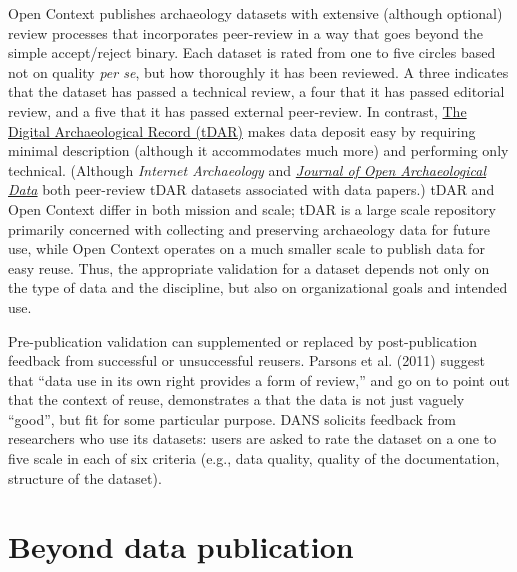 \documentclass[10pt,twocolumn]{article}
\begin{document}
Open Context publishes archaeology datasets with extensive (although optional) review processes that incorporates peer-review in a way that goes beyond the simple accept/reject binary.\cite{kansa_we_2013}
Each dataset is rated from one to five circles based not on quality \emph{per se}, but how thoroughly it has been reviewed.
A three indicates that the dataset has passed a technical review, a four that it has passed editorial review, and a five that it has passed external peer-review.
In contrast, \href{http://www.tdar.org/}{The Digital Archaeological Record (tDAR)} makes data deposit easy by requiring minimal description (although it accommodates much more) and performing only technical.
(Although \emph{Internet Archaeology} and \href{http://openarchaeologydata.metajnl.com/}{\emph{Journal of Open Archaeological Data}} both peer-review tDAR datasets associated with data papers.)
tDAR and Open Context differ in both mission and scale; tDAR is a large scale repository primarily concerned with collecting and preserving archaeology data for future use, while Open Context operates on a much smaller scale to publish data for easy reuse.
Thus, the appropriate validation for a dataset depends not only on the type of data and the discipline, but also on organizational goals and intended use.

Pre-publication validation can supplemented or replaced by post-publication feedback from successful or unsuccessful reusers.
Parsons et al. (2011) suggest that ``data use in its own right provides a form of review,'' and go on to point out that the context of reuse, demonstrates a that the data is not just vaguely ``good'', but fit for some particular purpose.\cite{parsons_data_2011}
DANS solicits feedback from researchers who use its datasets: users are asked to rate the dataset on a one to five scale in each of six criteria (e.g., data quality, quality of the documentation, structure of the dataset).\cite{grootveld_data_2011,grootveld_peer-reviewed_2012}


\section*{Beyond data publication}\label{beyond-data-publication}
\end{document}
